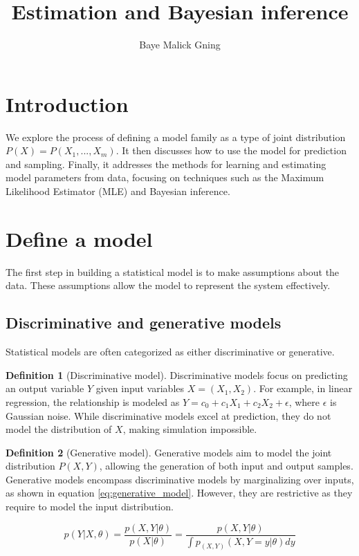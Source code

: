 \documentclass[12pt, a4paper]{article}
\author{Baye Malick Gning}
\date{}
\title{Estimation and Bayesian inference}
\theoremstyle{definition}
\newtheorem{definition}{Definition}[section]
\numberwithin{figure}{section}
\numberwithin{equation}{section}
\numberwithin{table}{section}
\begin{document}
\maketitle
\vspace{2cm}


\newpage
\tableofcontents
\newpage


\section{Introduction}
We explore the process of defining a model family as a type of joint distribution $P(X)=P(X_1,...,X_m)$. It then discusses how to use the model for prediction and sampling. Finally, it addresses the methods for learning and estimating model parameters from data, focusing on techniques such as the Maximum Likelihood Estimator (MLE) and Bayesian inference.

\section{Define a model}
The first step in building a statistical model is to make assumptions about the data. These assumptions allow the model to represent the system effectively.

\subsection{Discriminative and generative models}
Statistical models are often categorized as either discriminative or generative.

\begin{definition}[Discriminative model]
Discriminative models focus on predicting an output variable $Y$ given input variables $X=(X_1, X_2)$. For example, in linear regression, the relationship is modeled as $Y = c_0 + c_1 X_1 + c_2 X_2 + \epsilon$, where $\epsilon$ is Gaussian noise. While discriminative models excel at prediction, they do not model the distribution of $X$, making simulation impossible.
\end{definition}

\begin{definition}[Generative model]
Generative models aim to model the joint distribution $P(X, Y)$, allowing the generation of both input and output samples. Generative models encompass discriminative models by marginalizing over inputs, as shown in equation \ref{eq:generative_model}. However, they are restrictive as they require to model the input distribution.

\begin{equation}
    p(Y | X, \theta) = \frac{p(X, Y | \theta)}{p(X | \theta)} = \frac{p(X, Y | \theta)}{\int p_{(X,Y)}(X,Y=y|\theta)dy}
    \label{eq:generative_model}
\end{equation}

\end{definition}
\end{document}
